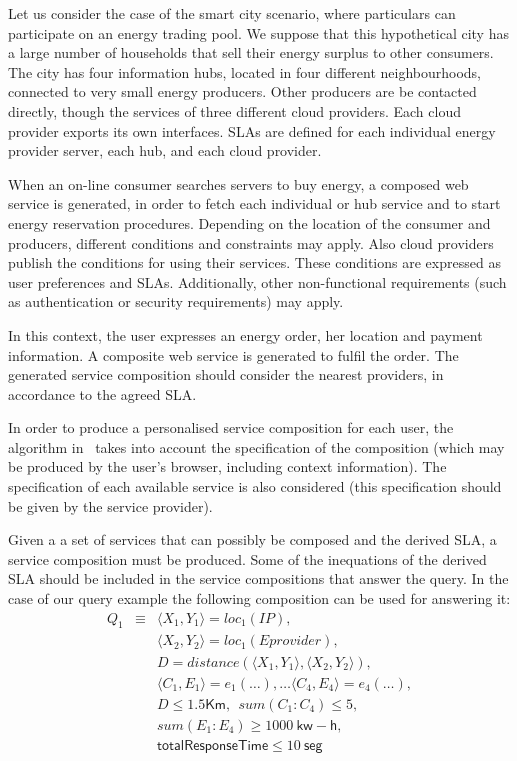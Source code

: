 \begin{example}\label{Ex:rew1}
Let us consider the case of the smart city scenario, where particulars can participate on an energy trading pool.
We suppose that this hypothetical city has a large number of households that sell their energy surplus to other consumers. 
The city has four information hubs, located in four different neighbourhoods, connected to very small energy producers.
Other producers are be contacted directly, though the services of three different cloud providers.
Each cloud provider exports its own interfaces.
 SLAs are defined for each individual energy provider server, each hub, and each cloud provider. 

When an on-line consumer searches  servers to buy energy, a composed web service is generated, in order to fetch each individual or hub service and to start  energy reservation procedures.
Depending on the location of the consumer and producers, different conditions and constraints may apply.
Also  cloud providers  publish the conditions for using their services.
These conditions are expressed as user preferences and SLAs.
Additionally, other non-functional requirements (such as authentication or security requirements) may apply.

In this context, the user  expresses an energy order, her location and payment information. A composite web service is  generated to fulfil the order.
The generated service composition should consider the nearest providers, in accordance to the agreed SLA.

In order to produce a personalised service composition for each user, the algorithm in~\cite{CostaAMR13} takes into account the specification of the composition (which may be produced by the user's browser, including context information).
The specification of each available service is also considered (this specification should be given by the service provider).
~\hfill\openbox
\end{example}


Given a a set of services that can possibly be composed and the derived SLA, a service composition must be produced.
Some of the inequations of the derived SLA should be included in the service compositions that answer the query.
In the case of our query example the following composition can be used for answering it:
\begin{eqnarray*}
Q_1 &\equiv&
   \langle X_1,Y_1\rangle = loc_1(IP), \\
&& \langle X_2,Y_2 \rangle = loc_1(Eprovider), \\
&& D = distance(\langle X_1,Y_1\rangle, \langle X_2,Y_2\rangle), \\
&& \langle C_1, E_1 \rangle = e_1(\dots), \dots \langle C_4, E_4 \rangle = e_4(\dots), \\
&& D \leq 1.5 \mathsf{Km},\ \ sum(C_1:C_4) \leq 5, \\
&& sum(E_1:E_4) \geq 1000\ \mathsf{kw-h}, \\
&& \mathsf{totalResponseTime}  \leq 10\ \mathsf{seg}
\end{eqnarray*}

